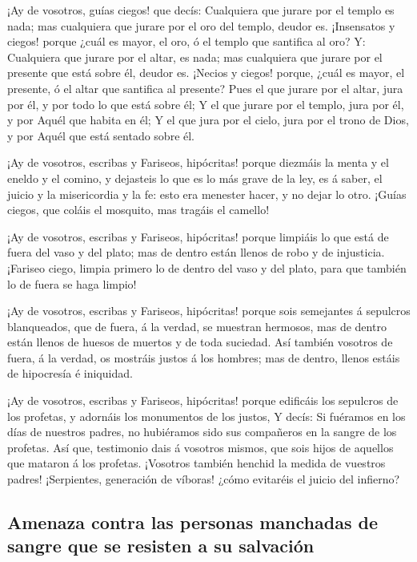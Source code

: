  ¡Ay de vosotros, guías ciegos! que decís: Cualquiera que
jurare por el templo es nada; mas cualquiera que jurare por el oro del
templo, deudor es.  ¡Insensatos y ciegos! porque ¿cuál es
mayor, el oro, ó el templo que santifica al oro?  Y:
Cualquiera que jurare por el altar, es nada; mas cualquiera que jurare
por el presente que está sobre él, deudor es.  ¡Necios y
ciegos! porque, ¿cuál es mayor, el presente, ó el altar que santifica al
presente?  Pues el que jurare por el altar, jura por él, y
por todo lo que está sobre él;  Y el que jurare por el
templo, jura por él, y por Aquél que habita en él;  Y el
que jura por el cielo, jura por el trono de Dios, y por Aquél que está
sentado sobre él.

 ¡Ay de vosotros, escribas y Fariseos, hipócritas! porque
diezmáis la menta y el eneldo y el comino, y dejasteis lo que es lo más
grave de la ley, es á saber, el juicio y la misericordia y la fe: esto
era menester hacer, y no dejar lo otro.  ¡Guías ciegos, que
coláis el mosquito, mas tragáis el camello!

 ¡Ay de vosotros, escribas y Fariseos, hipócritas! porque
limpiáis lo que está de fuera del vaso y del plato; mas de dentro están
llenos de robo y de injusticia.  ¡Fariseo ciego, limpia
primero lo de dentro del vaso y del plato, para que también lo de fuera
se haga limpio!

 ¡Ay de vosotros, escribas y Fariseos, hipócritas! porque
sois semejantes á sepulcros blanqueados, que de fuera, á la verdad, se
muestran hermosos, mas de dentro están llenos de huesos de muertos y de
toda suciedad.  Así también vosotros de fuera, á la verdad,
os mostráis justos á los hombres; mas de dentro, llenos estáis de
hipocresía é iniquidad.

 ¡Ay de vosotros, escribas y Fariseos, hipócritas! porque
edificáis los sepulcros de los profetas, y adornáis los monumentos de
los justos,  Y decís: Si fuéramos en los días de nuestros
padres, no hubiéramos sido sus compañeros en la sangre de los profetas.
 Así que, testimonio dais á vosotros mismos, que sois hijos
de aquellos que mataron á los profetas.  ¡Vosotros también
henchid la medida de vuestros padres!  ¡Serpientes,
generación de víboras! ¿cómo evitaréis el juicio del infierno?

\hypertarget{amenaza-contra-las-personas-manchadas-de-sangre-que-se-resisten-a-su-salvaciuxf3n}{%
\subsection{Amenaza contra las personas manchadas de sangre que se
resisten a su
salvación}\label{amenaza-contra-las-personas-manchadas-de-sangre-que-se-resisten-a-su-salvaciuxf3n}}

